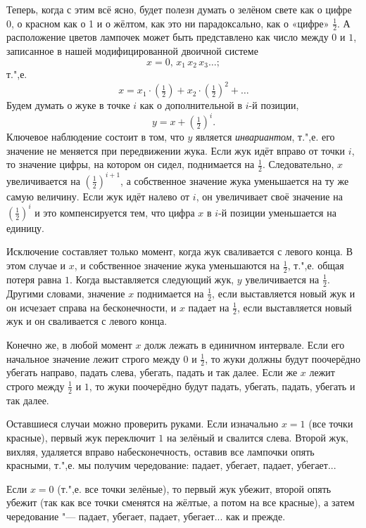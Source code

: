 \documentclass[twoside]{book}
\begin{document}
Теперь, когда с этим всё ясно, будет полезн думать о зелёном свете как о цифре 0, о красном как о 1 и о жёлтом, как это ни парадоксально, как о «цифре» $\tfrac12$.
А расположение цветов лампочек может быть представлено как число между $0$ и $1$, записанное в нашей модифицированной двоичной системе\change{}{;}
\[x = 0{,}\,x_1\,x_2\,x_3\dots;\]
т.",е.
 \[x = x_1\cdot(\tfrac12)+x_2\cdot(\tfrac12)^2+\dots\]
Будем думать о жуке в точке $i$ как о дополнительной  в $i$-й позиции, 
\[y=x+(\tfrac12)^i.\]
Ключевое наблюдение состоит в том, что $y$ является \emph{инвариантом}, т.",е. его значение не меняется при передвижении жука.
Если жук идёт вправо от точки $i$, то значение цифры, на котором он сидел, поднимается на $\tfrac12$.
Следовательно, $x$ увеличивается на $(\tfrac12)^{i+1}$, а собственное значение жука уменьшается на ту же самую величину.
Если жук идёт налево от $i$, он увеличивает своё значение на $(\tfrac12)^i$ и это компенсируется тем, что цифра $x$ в $i$-й позиции уменьшается на единицу.

Исключение составляет только момент, когда жук сваливается с левого конца.
В этом случае и $x$, и собственное значение жука уменьшаются на $\tfrac12$, т.",е. общая потеря равна $1$.
Когда выставляется следующий жук, $y$ увеличивается на $\tfrac12$.
Другими словами, значение $x$ поднимается на $\tfrac12$, если выставляется новый жук и он исчезает справа на бесконечности, и $x$ падает на $\tfrac12$, если выставляется новый жук и он сваливается с левого конца.

Конечно же, в любой момент $x$ долж лежать в единичном интервале.
Если его начальное значение лежит строго между $0$ и $\tfrac12$, то жуки должны будут поочерёдно убегать направо, падать слева, убегать, падать и так далее.
Если же $x$ лежит строго между $\tfrac12$ и $1$, то жуки поочерёдно будут падать, убегать, падать, убегать и так далее.

Оставшиеся случаи можно проверить руками.
Если изначально $x = 1$ (все точки красные),  первый жук переключит $1$ на зелёный и свалится слева.
Второй жук, вихляя, удаляется вправо на\pagebreak[3] бесконечность, оставив все лампочки опять красными, т.",е. мы получим чередование: падает, убегает, падает, убегает...

Если $x = 0$ (т.",е. все точки зелёные), то первый жук убежит, второй опять убежит (так как все точки сменятся на жёлтые, а потом на все красные), а затем чередование "--- падает, убегает, падает, убегает... как и прежде.
\end{document}
